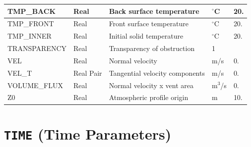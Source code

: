 \documentclass[11pt]{book}
\begin{document}
\begin{longtable}{|l|l|l|l|l|}
{\ct TMP\_BACK}                       & Real            & Back surface temperature          & $^\circ$C           & 20.    \\ \hline
{\ct TMP\_FRONT}                      & Real            & Front surface temperature         & $^\circ$C           & 20.    \\ \hline
{\ct TMP\_INNER}                      & Real            & Initial solid temperature         & $^\circ$C           & 20.    \\ \hline
{\ct TRANSPARENCY}                    & Real            & Transparency of obstruction       &    1                &           \\ \hline
{\ct VEL    }                         & Real            & Normal velocity                   & m/s                 & 0.     \\ \hline
{\ct VEL\_T }                         & Real Pair       & Tangential velocity components    & m/s                 & 0.     \\ \hline
{\ct VOLUME\_FLUX}                    & Real            & Normal velocity x vent area       & m$^3$/s             & 0.     \\ \hline
{\ct Z0 }                             & Real            & Atmospheric profile origin        &  m                  & 10.    \\ \hline
\end{longtable}



\vspace{\baselineskip}

\vfill

\section{\texorpdfstring{{\tt TIME}}{TIME} (Time Parameters)}

\hspace{1in}
\end{document}
